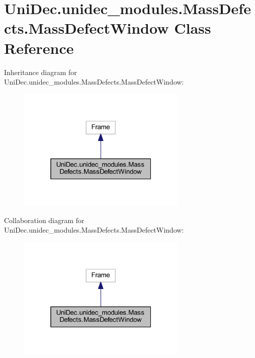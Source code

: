 \hypertarget{class_uni_dec_1_1unidec__modules_1_1_mass_defects_1_1_mass_defect_window}{}\section{Uni\+Dec.\+unidec\+\_\+modules.\+Mass\+Defects.\+Mass\+Defect\+Window Class Reference}
\label{class_uni_dec_1_1unidec__modules_1_1_mass_defects_1_1_mass_defect_window}


Inheritance diagram for Uni\+Dec.\+unidec\+\_\+modules.\+Mass\+Defects.\+Mass\+Defect\+Window\+:\nopagebreak
\begin{figure}[H]
\begin{center}
\leavevmode
\includegraphics[width=229pt]{class_uni_dec_1_1unidec__modules_1_1_mass_defects_1_1_mass_defect_window__inherit__graph}
\end{center}
\end{figure}


Collaboration diagram for Uni\+Dec.\+unidec\+\_\+modules.\+Mass\+Defects.\+Mass\+Defect\+Window\+:\nopagebreak
\begin{figure}[H]
\begin{center}
\leavevmode
\includegraphics[width=229pt]{class_uni_dec_1_1unidec__modules_1_1_mass_defects_1_1_mass_defect_window__coll__graph}
\end{center}
\end{figure}
